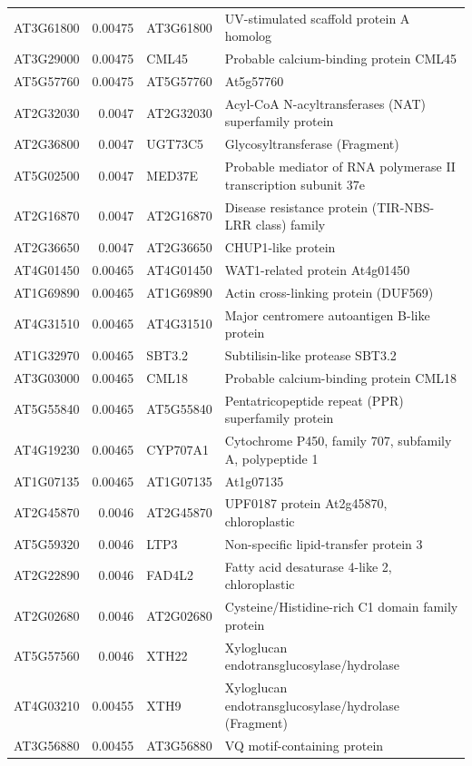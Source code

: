 \documentclass[11pt]{article}
\begin{document}
\begin{center}
\begin{tabular}{lrll}
AT3G61800 & 0.00475 & AT3G61800 & UV-stimulated scaffold protein A homolog\\
AT3G29000 & 0.00475 & CML45 & Probable calcium-binding protein CML45\\
AT5G57760 & 0.00475 & AT5G57760 & At5g57760\\
AT2G32030 & 0.0047 & AT2G32030 & Acyl-CoA N-acyltransferases (NAT) superfamily protein\\
AT2G36800 & 0.0047 & UGT73C5 & Glycosyltransferase (Fragment)\\
AT5G02500 & 0.0047 & MED37E & Probable mediator of RNA polymerase II transcription subunit 37e\\
AT2G16870 & 0.0047 & AT2G16870 & Disease resistance protein (TIR-NBS-LRR class) family\\
AT2G36650 & 0.0047 & AT2G36650 & CHUP1-like protein\\
AT4G01450 & 0.00465 & AT4G01450 & WAT1-related protein At4g01450\\
AT1G69890 & 0.00465 & AT1G69890 & Actin cross-linking protein (DUF569)\\
AT4G31510 & 0.00465 & AT4G31510 & Major centromere autoantigen B-like protein\\
AT1G32970 & 0.00465 & SBT3.2 & Subtilisin-like protease SBT3.2\\
AT3G03000 & 0.00465 & CML18 & Probable calcium-binding protein CML18\\
AT5G55840 & 0.00465 & AT5G55840 & Pentatricopeptide repeat (PPR) superfamily protein\\
AT4G19230 & 0.00465 & CYP707A1 & Cytochrome P450, family 707, subfamily A, polypeptide 1\\
AT1G07135 & 0.00465 & AT1G07135 & At1g07135\\
AT2G45870 & 0.0046 & AT2G45870 & UPF0187 protein At2g45870, chloroplastic\\
AT5G59320 & 0.0046 & LTP3 & Non-specific lipid-transfer protein 3\\
AT2G22890 & 0.0046 & FAD4L2 & Fatty acid desaturase 4-like 2, chloroplastic\\
AT2G02680 & 0.0046 & AT2G02680 & Cysteine/Histidine-rich C1 domain family protein\\
AT5G57560 & 0.0046 & XTH22 & Xyloglucan endotransglucosylase/hydrolase\\
AT4G03210 & 0.00455 & XTH9 & Xyloglucan endotransglucosylase/hydrolase (Fragment)\\
AT3G56880 & 0.00455 & AT3G56880 & VQ motif-containing protein\\

\end{tabular}
\end{center}
\end{document}
